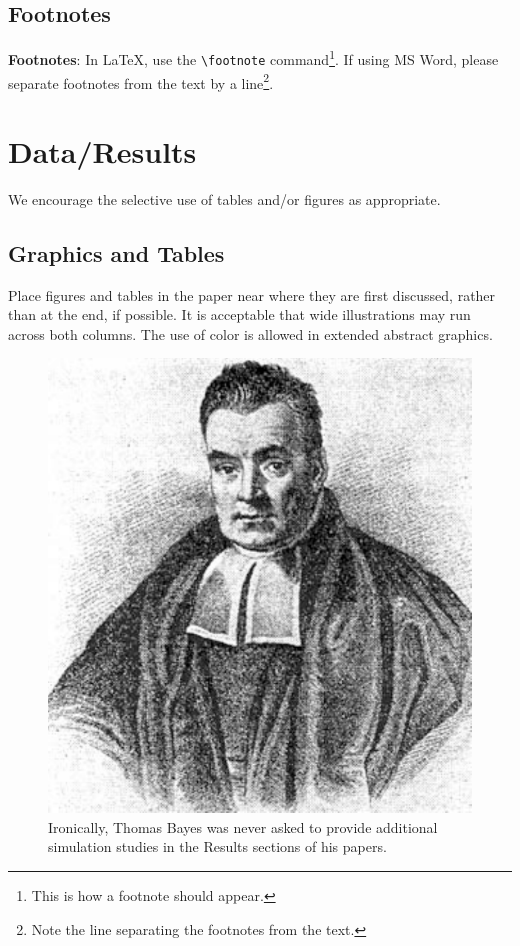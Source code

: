 \documentclass[10pt]{article}
\begin{document}
\subsection{Footnotes}

{\bf Footnotes}: In \LaTeX, use the \verb+\footnote+
command\footnote{This is how a footnote should appear.}. If using
MS Word, please separate footnotes
from the text by a line\footnote{Note the line
  separating the footnotes from the text.}.

\section{Data/Results}

We encourage the selective use of tables and/or figures as appropriate.

\subsection{Graphics and Tables}

Place figures and tables in the
paper near where they are first discussed, rather than at the end, if
possible.  It is acceptable that wide illustrations
may run across both columns.  The use of color
is allowed in extended abstract graphics.

\begin{figure}[ht]
  \begin{center}
    \centerline{\includegraphics[width=\columnwidth]{bayes}}
    \caption{Ironically, Thomas Bayes was never asked to provide additional
      simulation studies in the Results sections of his papers.}
    \label{bayespic}
  \end{center}
\end{figure}
\end{document}
